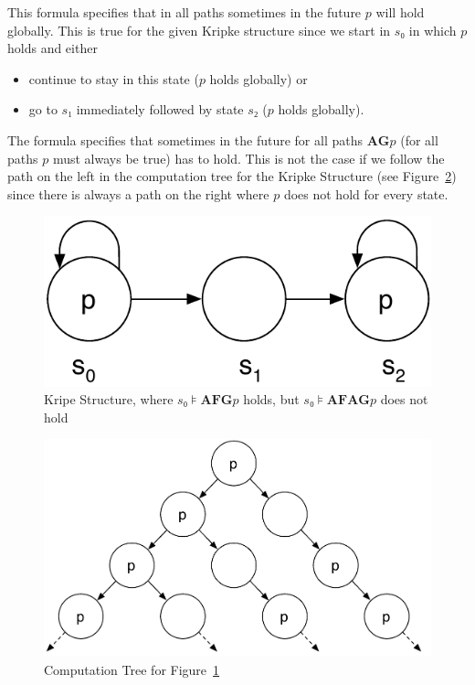 \documentclass[a4paper, 12pt]{article}
\begin{document}
\begin{description}[style=multiline, leftmargin=3cm]

    \item[$s₀⊧\mathbf{AF}(\mathbf{G} p)$] This formula specifies that in all
    paths sometimes in the future $p$ will hold globally. This is true for the
    given Kripke structure since we start in $s₀$ in which $p$ holds and either

        \begin{itemize}

            \item continue to stay in this state ($p$ holds globally) or

            \item go to $s₁$ immediately followed by state $s₂$ ($p$ holds
            globally).

        \end{itemize}

    \item[$s₀⊧\mathbf{AF}(\mathbf{AG} p)$] The formula specifies that
    sometimes in the future for all paths $\mathbf{AG} p$ (for all paths $p$
    must always be true) has to hold. This is not the case if we follow the
    path on the left in the computation tree for the Kripke Structure (see
    Figure~\ref{figure:Computation_Tree_Exercise_6}) since there is always a
    path on the right where $p$ does not hold for every state.

\end{description}

\begin{figure}[htbp]
    \centering
        \includegraphics[width=.4\textwidth]
            {Figures/Kripke Structure Exercise 6.pdf}
    \caption{Kripe Structure, where $s₀⊧\mathbf{AFG} p$ holds, but
             $s₀⊧\mathbf{AFAG} p$ does not hold}
    \label{figure:Kripke_Structure_Exercise_6}
\end{figure}

\begin{figure}[htbp]
    \centering
        \includegraphics[width=.7\textwidth]
            {Figures/Computation Tree Exercise 6.pdf}
    \caption{Computation Tree for
             Figure~\ref{figure:Kripke_Structure_Exercise_6}}
    \label{figure:Computation_Tree_Exercise_6}
\end{figure}
\end{document}
